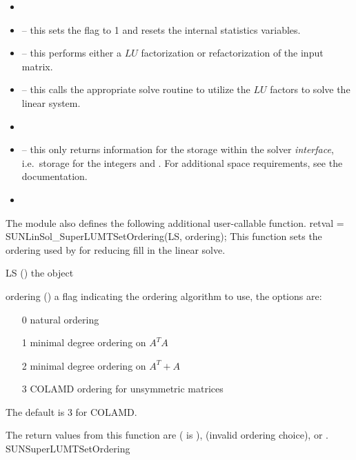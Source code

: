 \begin{itemize}
\item {}
\item {} -- this sets the
   flag to 1 and resets the internal {\superlumt}
  statistics variables.
\item {} -- this performs either a $LU$
  factorization or refactorization of the input matrix.
\item {} -- this calls the appropriate
  {\superlumt} solve routine to utilize the $LU$ factors to solve the
  linear system. 
\item {}
\item {} -- this only returns information for
  the storage within the solver \emph{interface}, i.e.~storage for the
  integers  and .  For additional
  space requirements, see the {\superlumt} documentation.
\item {}
\end{itemize}

The {\sunlinsolslumt} module also defines the following additional
user-callable function.
%
%
{
  retval = SUNLinSol\_SuperLUMTSetOrdering(LS, ordering);
}
{
  This function sets the ordering used by {\superlumt} for reducing fill in
  the linear solve.
}
{
  \begin{args}[ordering]
  \item[LS] ()
    the {\sunlinsolslumt} object
  \item[ordering] ()
    a flag indicating the ordering algorithm to use, the options are:
    \begin{itemize}
    \item[0] natural ordering
    \item[1] minimal degree ordering on $A^TA$
    \item[2] minimal degree ordering on $A^T+A$
    \item[3] COLAMD ordering for unsymmetric matrices
    \end{itemize}
    The default is 3 for COLAMD.
  \end{args}
}
{
  The return values from this function are 
  ( is ), \newline {}
  (invalid ordering choice), or .
}
{}
{SUNSuperLUMTSetOrdering}

